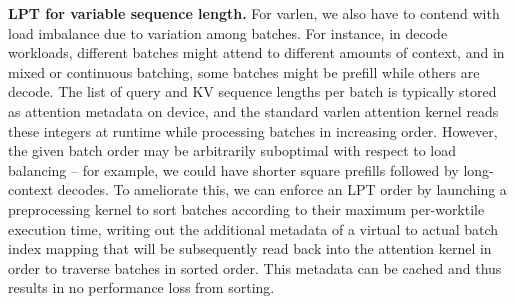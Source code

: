 \textbf{LPT for variable sequence length.} For varlen, we also have to contend with load imbalance due to variation among batches. For instance, in decode workloads, different batches might attend to different amounts of context, and in mixed or continuous batching, some batches might be prefill while others are decode. The list of query and KV sequence lengths per batch is typically stored as attention metadata on device, and the standard varlen attention kernel reads these integers at runtime while processing batches in increasing order. However, the given batch order may be arbitrarily suboptimal with respect to load balancing -- for example, we could have shorter square prefills followed by long-context decodes. To ameliorate this, we can enforce an LPT order by launching a preprocessing kernel to sort batches according to their maximum per-worktile execution time, writing out the additional metadata of a virtual to actual batch index mapping that will be subsequently read back into the attention kernel in order to traverse batches in sorted order. This metadata can be cached and thus results in no performance loss from sorting.



